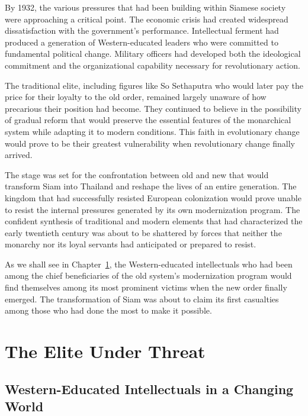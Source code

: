 \documentclass[
  Letterpaper,
]{scrbook}
\begin{document}
By 1932, the various pressures that had been building within Siamese
society were approaching a critical point. The economic crisis had
created widespread dissatisfaction with the government's performance.
Intellectual ferment had produced a generation of Western-educated
leaders who were committed to fundamental political change. Military
officers had developed both the ideological commitment and the
organizational capability necessary for revolutionary action.

The traditional elite, including figures like So Sethaputra who would
later pay the price for their loyalty to the old order, remained largely
unaware of how precarious their position had become. They continued to
believe in the possibility of gradual reform that would preserve the
essential features of the monarchical system while adapting it to modern
conditions. This faith in evolutionary change would prove to be their
greatest vulnerability when revolutionary change finally arrived.

The stage was set for the confrontation between old and new that would
transform Siam into Thailand and reshape the lives of an entire
generation. The kingdom that had successfully resisted European
colonization would prove unable to resist the internal pressures
generated by its own modernization program. The confident synthesis of
traditional and modern elements that had characterized the early
twentieth century was about to be shattered by forces that neither the
monarchy nor its loyal servants had anticipated or prepared to resist.

As we shall see in Chapter~\ref{sec-elite-threat}, the Western-educated
intellectuals who had been among the chief beneficiaries of the old
system's modernization program would find themselves among its most
prominent victims when the new order finally emerged. The transformation
of Siam was about to claim its first casualties among those who had done
the most to make it possible.


\chapter{The Elite Under Threat}\label{sec-elite-threat}

\section{Western-Educated Intellectuals in a Changing
World}\label{western-educated-intellectuals-in-a-changing-world}
\end{document}
